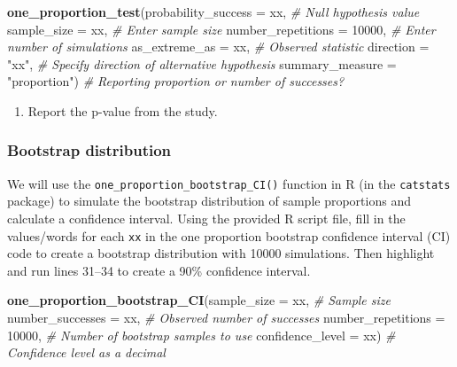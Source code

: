 \documentclass[
]{report}
\newenvironment{Shaded}{\begin{snugshade}}{\end{snugshade}}
\newcommand{\AttributeTok}[1]{\textcolor[rgb]{0.13,0.29,0.53}{#1}}
\newcommand{\CommentTok}[1]{\textcolor[rgb]{0.56,0.35,0.01}{\textit{#1}}}
\newcommand{\DecValTok}[1]{\textcolor[rgb]{0.00,0.00,0.81}{#1}}
\newcommand{\FunctionTok}[1]{\textcolor[rgb]{0.13,0.29,0.53}{\textbf{#1}}}
\newcommand{\NormalTok}[1]{#1}
\newcommand{\StringTok}[1]{\textcolor[rgb]{0.31,0.60,0.02}{#1}}
\providecommand{\tightlist}{%
  \setlength{\itemsep}{0pt}\setlength{\parskip}{0pt}}
\begin{document}
\begin{Shaded}
\begin{Highlighting}[]
\FunctionTok{one\_proportion\_test}\NormalTok{(}\AttributeTok{probability\_success =}\NormalTok{ xx, }\CommentTok{\# Null hypothesis value}
          \AttributeTok{sample\_size =}\NormalTok{ xx, }\CommentTok{\# Enter sample size}
          \AttributeTok{number\_repetitions =} \DecValTok{10000}\NormalTok{, }\CommentTok{\# Enter number of simulations}
          \AttributeTok{as\_extreme\_as =}\NormalTok{ xx, }\CommentTok{\# Observed statistic}
          \AttributeTok{direction =} \StringTok{"xx"}\NormalTok{, }\CommentTok{\# Specify direction of alternative hypothesis}
          \AttributeTok{summary\_measure =} \StringTok{"proportion"}\NormalTok{) }\CommentTok{\# Reporting proportion or number of successes?}
\end{Highlighting}
\end{Shaded}

\begin{enumerate}
\def\labelenumi{\arabic{enumi}.}
\setcounter{enumi}{5}
\tightlist
\item
  Report the p-value from the study.
\end{enumerate}

\vspace{0.2in}

\subsubsection*{Bootstrap distribution}\label{bootstrap-distribution}

We will use the \texttt{one\_proportion\_bootstrap\_CI()} function in R (in the \texttt{catstats} package) to simulate the bootstrap distribution of sample proportions and calculate a confidence interval. Using the provided R script file, fill in the values/words for each \texttt{xx} in the one proportion bootstrap confidence interval (CI) code to create a bootstrap distribution with 10000 simulations. Then highlight and run lines 31--34 to create a 90\% confidence interval.

\begin{Shaded}
\begin{Highlighting}[]
\FunctionTok{one\_proportion\_bootstrap\_CI}\NormalTok{(}\AttributeTok{sample\_size =}\NormalTok{ xx, }\CommentTok{\# Sample size}
                    \AttributeTok{number\_successes =}\NormalTok{ xx, }\CommentTok{\# Observed number of successes}
                    \AttributeTok{number\_repetitions =} \DecValTok{10000}\NormalTok{, }\CommentTok{\# Number of bootstrap samples to use}
                    \AttributeTok{confidence\_level =}\NormalTok{ xx) }\CommentTok{\# Confidence level as a decimal}
\end{Highlighting}
\end{Shaded}
\end{document}
